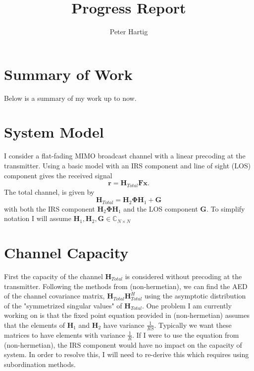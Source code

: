 \documentclass[12pt,a4paper]{report}
\title{Progress Report}
\author{Peter Hartig}
\begin{document}
\maketitle
\tableofcontents


\section{Summary of Work}
Below is a summary of my work up to now.
\section{System Model}
I consider a flat-fading MIMO broadcast channel with a linear precoding at the transmitter. 
Using a basic model with an IRS component and line of sight (LOS) component gives the received signal 
	 \begin{equation}\label{system_model}
		\mathbf{r} = \mathbf{H}_{Total}\mathbf{F}\mathbf{x}.
	\end{equation}
	The total channel, is given by
	\begin{equation}
	\mathbf{H}_{Total} =  \mathbf{H}_{2}\boldsymbol{\Phi}\mathbf{H}_{1} + \mathbf{G}
	\end{equation}
	with both the IRS component $ \mathbf{H}_{2}\boldsymbol{\Phi}\mathbf{H}_{1}$ and 
	the LOS component $\mathbf{G}$. To simplify notation I will assume 
	$\mathbf{H}_{1},\mathbf{H}_{2}, \mathbf{G} \in \mathbb{C}_{N \times N}$

\section{Channel Capacity}
First the capacity of the channel $\mathbf{H}_{Total}$ is considered without precoding at the transmitter. 
Following the methods from (non-hermetian), we can find the AED of the channel 
covariance matrix, $\mathbf{H}_{Total}\mathbf{H}_{Total}^H$ using the asymptotic distribution of the "symmetrized singular values" of $\mathbf{H}_{Total}$.
One problem I am currently working on is that the fixed point equation  provided in (non-hermetian) assumes that the
 elements of $ \mathbf{H}_{1}$ and  $\mathbf{H}_{2}$ have variance $\frac{1}{RS}$. Typically we want these
  matrices to have elements with variance $\frac{1}{R}$.
  If I were to use the equation from (non-hermetian), the IRS component would have no impact on the capacity of system. In order to resolve this, I will need to re-derive this which requires using subordination methods. 
\end{document}
